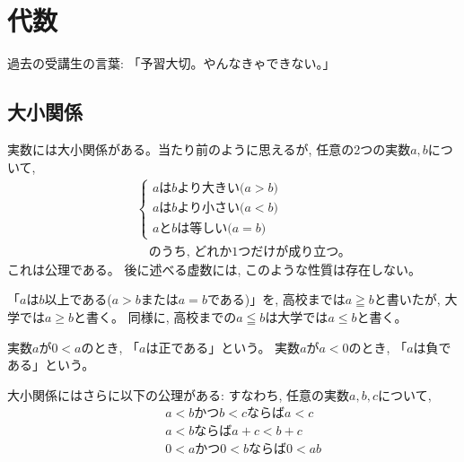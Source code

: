 \chapter{代数}\label{chapt:algebra}
{\small 過去の受講生の言葉: 「予習大切。やんなきゃできない。」}



\section{大小関係}\label{sec:order}

実数には大小関係がある。当たり前のように思えるが, 
任意の2つの実数$a, b$について, 
\begin{eqnarray}
&&\begin{cases}
\text{$a$は$b$より大きい($a>b$)}\\
\text{$a$は$b$より小さい($a<b$)}\\
\text{$a$と$b$は等しい($a=b$)}
\end{cases}\nonumber\\
&&\quad\text{のうち, どれか1つだけが成り立つ。}\label{eq:axiom_order0}
\end{eqnarray}
これは公理である。
後に述べる虚数には, このような性質は存在しない。

「$a$は$b$以上である($a>b$または$a=b$である)」を, 
高校までは$a\geqq b$と書いたが, 大学では$a \geq b$と書く。
同様に, 高校までの$a\leqq b$は大学では$a \leq b$と書く。

実数$a$が$0<a$のとき, 「$a$は正である」という。
実数$a$が$a<0$のとき, 「$a$は負である」という。

大小関係にはさらに以下の公理がある: すなわち, 任意の実数$a, b, c$について, 
\begin{eqnarray}
&&a<b\text{かつ}b<c\text{ならば}a<c\label{eq:axiom_order1}\\
&&a<b\text{ならば}a+c<b+c\label{eq:axiom_order2}\\
&&0<a\text{かつ}0<b\text{ならば}0<ab\label{eq:axiom_order3}
\end{eqnarray}

